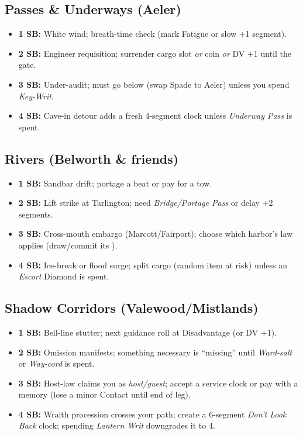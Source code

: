 \documentclass[11pt,letterpaper,twoside]{book}
\begin{document}
\subsection{Passes \& Underways (Aeler)}
\begin{itemize}
  \item \textbf{1 SB:} White wind; breath-time check (mark Fatigue or slow +1 segment).
  \item \textbf{2 SB:} Engineer requisition; surrender cargo slot \emph{or} coin \emph{or} DV +1 until the gate.
  \item \textbf{3 SB:} Under-audit; must go below (swap Spade to Aeler) unless you spend \emph{Key-Writ}.
  \item \textbf{4 SB:} Cave-in detour adds a fresh 4-segment clock unless \emph{Underway Pass} is spent.
\end{itemize}

\subsection{Rivers (Belworth \& friends)}
\begin{itemize}
  \item \textbf{1 SB:} Sandbar drift; portage a beat or pay for a tow.
  \item \textbf{2 SB:} Lift strike at Tarlington; need \emph{Bridge/Portage Pass} or delay +2 segments.
  \item \textbf{3 SB:} Cross-mouth embargo (Marcott/Fairport); choose which harbor's law applies (draw/commit its \SuitDiamond{}).
  \item \textbf{4 SB:} Ice-break or flood surge; split cargo (random item at risk) unless an \emph{Escort} Diamond is spent.
\end{itemize}

\subsection{Shadow Corridors (Valewood/Mistlands)}
\begin{itemize}
  \item \textbf{1 SB:} Bell-line stutter; next guidance roll at Disadvantage (or DV +1).
  \item \textbf{2 SB:} Omission manifests; something necessary is ``missing'' until \emph{Ward-salt} or \emph{Way-cord} is spent.
  \item \textbf{3 SB:} Host-law claims you as \emph{host/guest}; accept a service clock or pay with a memory (lose a minor Contact until end of leg).
  \item \textbf{4 SB:} Wraith procession crosses your path; create a 6-segment \emph{Don't Look Back} clock; spending \emph{Lantern Writ} downgrades it to 4.
\end{itemize}
\end{document}
